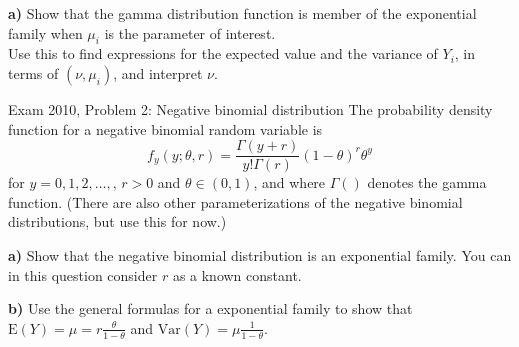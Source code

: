 \documentclass[
  ignorenonframetext,
]{beamer}
\begin{document}
\begin{frame}
\textbf{a)} Show that the gamma distribution function is member of the
exponential family when \(\mu_i\) is the parameter of interest.\\
Use this to find expressions for the expected value and the variance of
\(Y_i\), in terms of \((\nu,\mu_i)\), and interpret \(\nu\).
\end{frame}

\begin{frame}
\begin{block}{Exam 2010, Problem 2: Negative binomial distribution}
\label{exam-2010-problem-2-negative-binomial-distribution}
The probability density function for a negative binomial random variable
is
\[f_y(y; \theta, r) = \frac{\Gamma(y + r)}{y! \Gamma(r)} (1-\theta)^r \theta^y\]
for \(y = 0,1,2,\ldots,\), \(r>0\) and \(\theta \in (0,1)\), and where
\(\Gamma()\) denotes the gamma function. (There are also other
parameterizations of the negative binomial distributions, but use this
for now.)
\end{block}
\end{frame}

\begin{frame}
\textbf{a)} Show that the negative binomial distribution is an
exponential family. You can in this question consider \(r\) as a known
constant.

\textbf{b)} Use the general formulas for a exponential family to show
that \(\text{E}(Y)=\mu=r\frac{\theta}{1-\theta}\) and
\(\text{Var}(Y)=\mu \frac{1}{1-\theta}\).
\end{frame}
\end{document}
